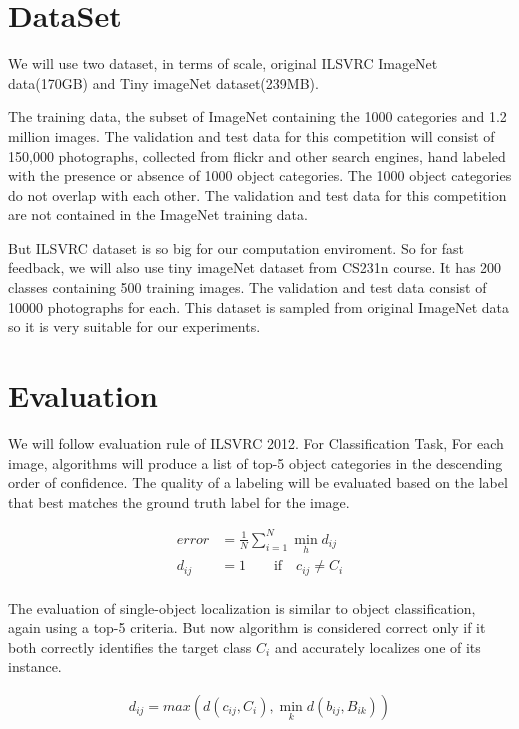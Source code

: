 \documentclass[10pt,twocolumn,letterpaper]{article}
\begin{document}
\section{DataSet}

We will use two dataset, in terms of scale, original ILSVRC ImageNet data(170GB) and Tiny imageNet dataset(239MB).

The training data, the subset of ImageNet containing the 1000 categories and 1.2 million images.
The validation and test data for this competition will consist of 150,000 photographs, collected from flickr and other search engines, hand labeled with the presence or absence of 1000 object categories.
The 1000 object categories do not overlap with each other.
The validation and test data for this competition are not contained in the ImageNet training data.

But ILSVRC dataset is so big for our computation enviroment.
So for fast feedback, we will also use tiny imageNet dataset from CS231n course.
It has 200 classes containing 500 training images.
The validation and test data consist of 10000 photographs for each.
This dataset is sampled from original ImageNet data so it is very suitable for our experiments.

\section{Evaluation}

We will follow evaluation rule of ILSVRC 2012.
For Classification Task, For each image, algorithms will produce a list of top-5 object categories in the descending order of confidence.
The quality of a labeling will be evaluated based on the label that best matches the ground truth label for the image.

\begin{align*}
error &= \frac {1} {N} \sum_{i=1}^{N} {\min_{h} {d_{ij}}} \\
d_{ij} &= 1 \quad\quad \text{if}\quad c_{ij} \neq C_i \\
\end{align*}

The evaluation of single-object localization is similar to object classification, again using a top-5 criteria.
But now algorithm is considered correct only if it both correctly identifies the target class $C_i$ and accurately localizes one of its instance.

\begin{align*}
d_{ij} = max(d(c_{ij}, C_{i}), \min_{k}d(b_{ij}, B_{ik}))
\end{align*}
\end{document}
